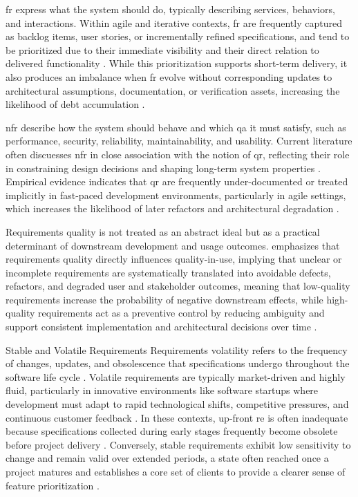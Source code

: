 \documentclass[12pt,reqno, twoside]{amsbook}
\makeatletter
\def\subsection{\@startsection{subsection}{2}%
      \z@{.5\linespacing\@plus.7\linespacing}{.25\linespacing}%
      {\normalfont\bfseries\flushleft}}
\theoremstyle{plain}
\numberwithin{equation}{chapter}
\numberwithin{section}{chapter}
\makeatother
\begin{document}
\gls{fr} express what the system should do, typically describing services, behaviors, and interactions. Within agile 
and iterative contexts, \gls{fr} are frequently captured as backlog items, user stories, or incrementally refined 
specifications, and tend to be prioritized due to their immediate visibility and their direct relation to delivered 
functionality \parencite{Behutiye2019,Behutiye2022}. While this prioritization supports short-term delivery, it also 
produces an imbalance when \gls{fr} evolve without corresponding updates to architectural assumptions, documentation, 
or verification assets, increasing the likelihood of debt accumulation \parencite{Rios2019,Melo2022}.

\gls{nfr} describe how the system should behave and which \gls{qa} it must satisfy, such as performance, security, 
reliability, maintainability, and usability. Current literature often discuesses \gls{nfr} in close association with 
the notion of \gls{qr}, reflecting their role in constraining design decisions and shaping long-term system properties 
\parencite{Behutiye2019,Behutiye2022}. Empirical evidence indicates that \gls{qr} are frequently under-documented or 
treated implicitly in fast-paced development environments, particularly in agile settings, which increases the 
likelihood of later refactors and architectural degradation \parencite{Behutiye2022,Scott2025}.

Requirements quality is not treated as an abstract ideal but as a practical determinant of downstream development and 
usage outcomes. \textcite{Femmer2019} emphasizes that requirements quality directly influences quality-in-use, implying 
that unclear or incomplete requirements are systematically translated into avoidable defects, refactors, and degraded 
user and stakeholder outcomes, meaning that low-quality requirements increase the probability of negative downstream 
effects, while high-quality requirements act as a preventive control by reducing ambiguity and support consistent 
implementation and architectural decisions over time \parencite{Femmer2019,Melo2022}.

\subsection{Stable and Volatile Requirements}
Requirements volatility refers to the frequency of changes, updates, and obsolescence that specifications undergo throughout 
the software life cycle \parencite{Gralha2018, Melo2022}. Volatile requirements are typically market-driven and highly fluid, 
particularly in innovative environments like software startups where development must adapt to rapid technological shifts, 
competitive pressures, and continuous customer feedback \parencite{Gralha2018}. In these contexts, up-front \gls{re} is often 
inadequate because specifications collected during early stages frequently become obsolete before project delivery 
\parencite{Gralha2018}. Conversely, stable requirements exhibit low sensitivity to change and remain valid over extended periods, 
a state often reached once a project matures and establishes a core set of clients to provide a clearer sense of feature 
prioritization \parencite{Arvanitou2019, Gralha2018}. 
\end{document}
